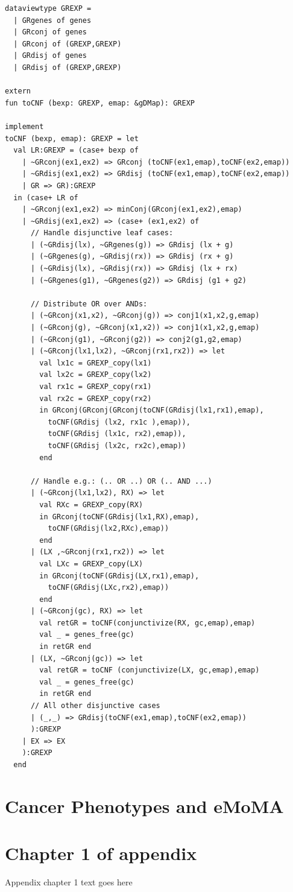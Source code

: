 \documentclass[phd,tocprelim]{cornell}
\begin{document}
\begin{verbatim}
dataviewtype GREXP = 
  | GRgenes of genes
  | GRconj of genes
  | GRconj of (GREXP,GREXP)
  | GRdisj of genes
  | GRdisj of (GREXP,GREXP)

extern
fun toCNF (bexp: GREXP, emap: &gDMap): GREXP

implement
toCNF (bexp, emap): GREXP = let     
  val LR:GREXP = (case+ bexp of 
    | ~GRconj(ex1,ex2) => GRconj (toCNF(ex1,emap),toCNF(ex2,emap))
    | ~GRdisj(ex1,ex2) => GRdisj (toCNF(ex1,emap),toCNF(ex2,emap))   
    | GR => GR):GREXP
  in (case+ LR of  
    | ~GRconj(ex1,ex2) => minConj(GRconj(ex1,ex2),emap) 
    | ~GRdisj(ex1,ex2) => (case+ (ex1,ex2) of
      // Handle disjunctive leaf cases:         
      | (~GRdisj(lx), ~GRgenes(g)) => GRdisj (lx + g) 
      | (~GRgenes(g), ~GRdisj(rx)) => GRdisj (rx + g)
      | (~GRdisj(lx), ~GRdisj(rx)) => GRdisj (lx + rx)
      | (~GRgenes(g1), ~GRgenes(g2)) => GRdisj (g1 + g2)

      // Distribute OR over ANDs:
      | (~GRconj(x1,x2), ~GRconj(g)) => conj1(x1,x2,g,emap) 
      | (~GRconj(g), ~GRconj(x1,x2)) => conj1(x1,x2,g,emap) 
      | (~GRconj(g1), ~GRconj(g2)) => conj2(g1,g2,emap)
      | (~GRconj(lx1,lx2), ~GRconj(rx1,rx2)) => let
        val lx1c = GREXP_copy(lx1)
        val lx2c = GREXP_copy(lx2) 
        val rx1c = GREXP_copy(rx1)
        val rx2c = GREXP_copy(rx2) 
        in GRconj(GRconj(GRconj(toCNF(GRdisj(lx1,rx1),emap), 
          toCNF(GRdisj (lx2, rx1c ),emap)),
          toCNF(GRdisj (lx1c, rx2),emap)), 
          toCNF(GRdisj (lx2c, rx2c),emap)) 
        end

      // Handle e.g.: (.. OR ..) OR (.. AND ...) 
      | (~GRconj(lx1,lx2), RX) => let
        val RXc = GREXP_copy(RX)
        in GRconj(toCNF(GRdisj(lx1,RX),emap),
          toCNF(GRdisj(lx2,RXc),emap)) 
        end
      | (LX ,~GRconj(rx1,rx2)) => let
        val LXc = GREXP_copy(LX)
        in GRconj(toCNF(GRdisj(LX,rx1),emap),
          toCNF(GRdisj(LXc,rx2),emap)) 
        end
      | (~GRconj(gc), RX) => let
        val retGR = toCNF(conjunctivize(RX, gc,emap),emap)
        val _ = genes_free(gc)
        in retGR end
      | (LX, ~GRconj(gc)) => let
        val retGR = toCNF (conjunctivize(LX, gc,emap),emap)
        val _ = genes_free(gc)
        in retGR end
      // All other disjunctive cases
      | (_,_) => GRdisj(toCNF(ex1,emap),toCNF(ex2,emap))
      ):GREXP
    | EX => EX
    ):GREXP
  end
\end{verbatim}


\chapter{Cancer Phenotypes and eMoMA}

\appendix
\chapter{Chapter 1 of appendix}
Appendix chapter 1 text goes here


\end{document}
